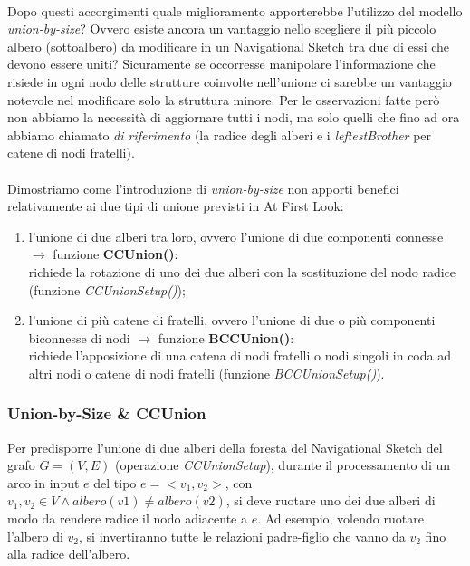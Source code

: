 \documentclass[a4paper,11pt]{report}
\begin{document}
\paragraph{}
Dopo questi accorgimenti quale miglioramento apporterebbe l'utilizzo del modello \emph{union-by-size}? Ovvero esiste ancora un vantaggio
nello scegliere il più piccolo albero
(sottoalbero) da modificare in un Navigational Sketch tra due di essi che devono essere uniti? Sicuramente se occorresse manipolare
l'informazione che risiede in ogni nodo delle strutture
coinvolte nell'unione ci sarebbe un vantaggio notevole nel modificare solo la struttura minore. Per le osservazioni fatte però  non abbiamo
la necessità di aggiornare tutti
i nodi, ma solo quelli che fino ad ora abbiamo chiamato \emph{di riferimento} (la radice degli alberi e i \emph{leftestBrother} per catene
di nodi fratelli).\\\\
Dimostriamo come l'introduzione di \emph{union-by-size} non apporti benefici relativamente ai due tipi di unione previsti in At First Look:
\begin{enumerate}
 \item l'unione di due alberi tra loro, ovvero l'unione di due componenti connesse $\rightarrow$ funzione \textbf{CCUnion()}:\\ richiede la
rotazione di uno dei due alberi con 
la sostituzione del nodo radice (funzione \emph{CCUnionSetup()});
 \item l'unione di più catene di fratelli, ovvero l'unione di due o più componenti biconnesse di nodi $\rightarrow$ funzione
\textbf{BCCUnion()}:\\ richiede l'apposizione di 
una catena di nodi fratelli o nodi singoli in coda ad altri nodi o catene di nodi fratelli (funzione \emph{BCCUnionSetup()}).
\end{enumerate}

\subsubsection{Union-by-Size \& CCUnion}
Per predisporre l'unione di due alberi della foresta del Navigational Sketch del grafo $G=(V,E)$ (operazione \emph{CCUnionSetup}), durante
il processamento di un arco in input $e$ 
del tipo $e=< v_1,v_2>$,
con $v_1,v_2\in V \wedge albero\left(v1\right)\neq albero\left(v2\right)$, si deve ruotare uno dei due alberi di modo da rendere radice il
nodo adiacente a $e$.
Ad esempio, volendo ruotare l'albero di $v_2$, si invertiranno tutte le relazioni padre-figlio che vanno da $v_2$ fino alla radice
dell'albero.
\end{document}
